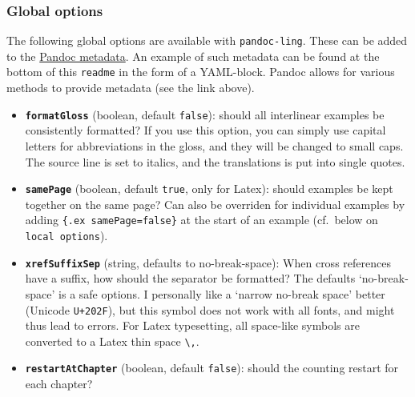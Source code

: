 \documentclass[
]{article}
\providecommand{\tightlist}{%
  \setlength{\itemsep}{0pt}\setlength{\parskip}{0pt}}
\begin{document}
\subsubsection{Global options}\label{global-options}

The following global options are available with \texttt{pandoc-ling}.
These can be added to the
\href{https://pandoc.org/MANUAL.html\#metadata-blocks}{Pandoc metadata}.
An example of such metadata can be found at the bottom of this
\texttt{readme} in the form of a YAML-block. Pandoc allows for various
methods to provide metadata (see the link above).

\begin{itemize}
\tightlist
\item
  \textbf{\texttt{formatGloss}} (boolean, default \texttt{false}):
  should all interlinear examples be consistently formatted? If you use
  this option, you can simply use capital letters for abbreviations in
  the gloss, and they will be changed to small caps. The source line is
  set to italics, and the translations is put into single quotes.
\item
  \textbf{\texttt{samePage}} (boolean, default \texttt{true}, only for
  Latex): should examples be kept together on the same page? Can also be
  overriden for individual examples by adding
  \texttt{\{.ex\ samePage=false\}} at the start of an example (cf.~below
  on \texttt{local\ options}).
\item
  \textbf{\texttt{xrefSuffixSep}} (string, defaults to no-break-space):
  When cross references have a suffix, how should the separator be
  formatted? The defaults `no-break-space' is a safe options. I
  personally like a `narrow no-break space' better (Unicode
  \texttt{U+202F}), but this symbol does not work with all fonts, and
  might thus lead to errors. For Latex typesetting, all space-like
  symbols are converted to a Latex thin space
  \texttt{\textbackslash{},}.
\item
  \textbf{\texttt{restartAtChapter}} (boolean, default \texttt{false}):
  should the counting restart for each chapter?


\end{itemize}
\end{document}
